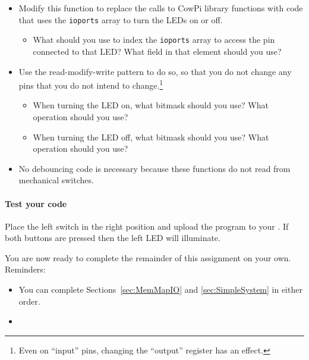 \begin{itemize}
    \item Modify this function to replace the calls to CowPi library functions with code that uses the \lstinline{ioports} array to turn the LEDs on or off.
        \begin{itemize}
            \item What should you use to index the \lstinline{ioports} array to access the pin connected to that LED?
                What field in that element should you use?
        \end{itemize}
    \item Use the read-modify-write pattern to do so, so that you do not change any pins that you do not intend to change.\footnote{Even on ``input'' pins, changing the ``output'' register has an effect.}
    \begin{itemize}
        \item When turning the LED on, what bitmask should you use?
            What operation should you use?
        \item When turning the LED off, what bitmask should you use?
            What operation should you use?
    \end{itemize}
    \item No debouncing code is necessary because these functions do not read from mechanical switches.
\end{itemize}

\paragraph{Test your code}

Place the left switch in the right position and upload the program to your \developmentboard.
If both buttons are pressed then the left LED will illuminate.


\vspace{1cm}

You are now ready to complete the remainder of this assignment on your own.
Reminders:
\begin{itemize}
    \item You can complete Sections~\ref{sec:MemMapIO} and \ref{sec:SimpleSystem} in either order.
    \item \collaborationrules
\end{itemize}
